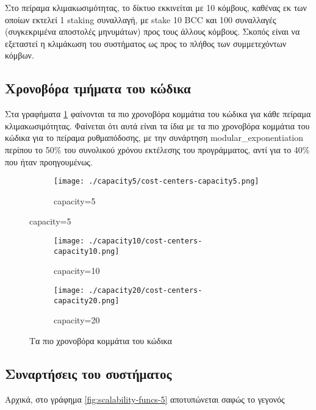 \documentclass{article}
\newcommand{\eng}[1]{\foreignlanguage{english}{#1}} %
\begin{document}
Στο πείραμα κλιμακωσιμότητας, το δίκτυο εκκινείται με 10 κόμβους, καθένας εκ
των οποίων εκτελεί 1 \eng{staking} συναλλαγή, με \eng{stake 10 BCC} και 100
συναλλαγές (συγκεκριμένα αποστολές μηνυμάτων) προς τους άλλους κόμβους. Σκοπός
είναι να εξεταστεί η κλιμάκωση του συστήματος ως προς το πλήθος των
συμμετεχόντων κόμβων.

\subsection{Χρονοβόρα τμήματα του κώδικα}

Στα γραφήματα \ref{fig:scalability-cost-centers} φαίνονται τα πιο χρονοβόρα
κομμάτια του κώδικα για κάθε πείραμα κλιμακωσιμότητας. Φαίνεται ότι αυτά είναι
τα ίδια με τα πιο χρονοβόρα κομμάτια του κώδικα για το πείραμα ρυθμαπόδοσης, με
την συνάρτηση \eng{modular\_exponentiation} περίπου το 50\% του συνολικού
χρόνου εκτέλεσης του προγράμματος, αντί για το 40\% που ήταν προηγουμένως.

\graphicspath{{../experiments/profiled\_outputs/scalability_proper/}}

\begin{figure}[ht]
    \centering
    \begin{subfigure}{\textwidth}
        \texttt{[image: ./capacity5/cost-centers-capacity5.png]}
        \caption{\eng{capacity=5}}
    \end{subfigure}
\end{figure}
\begin{figure}[ht]
    \ContinuedFloat
    \begin{subfigure}{\textwidth}
        \texttt{[image: ./capacity10/cost-centers-capacity10.png]}
        \caption{\eng{capacity=10}}
    \end{subfigure}
    \begin{subfigure}{\textwidth}
        \texttt{[image: ./capacity20/cost-centers-capacity20.png]}
        \caption{\eng{capacity=20}}
    \end{subfigure}
    \caption{Τα πιο χρονοβόρα κομμάτια του κώδικα}
    \label{fig:scalability-cost-centers}
\end{figure}
\FloatBarrier

\subsection{Συναρτήσεις του συστήματος}

Αρχικά, στο γράφημα \ref{fig:scalability-funcs-5} αποτυπώνεται σαφώς το
γεγονός
\end{document}
